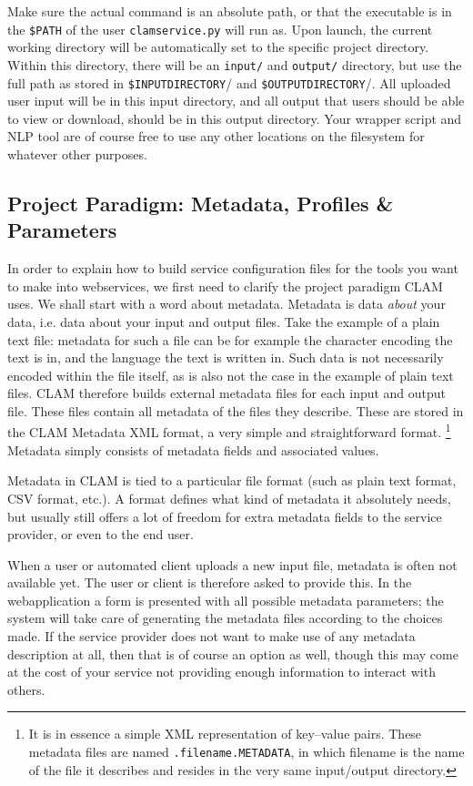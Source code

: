 \documentclass[a4paper,12pt,twoside,openright]{report}
\begin{document}
Make sure the actual command is an absolute path, or that the executable is in
the \texttt{\$PATH} of the user \texttt{clamservice.py} will run as. Upon
launch, the current working directory will be automatically set to the specific
project directory. Within this directory, there will be an \texttt{input/} and
\texttt{output/} directory, but use the full path as stored in
\texttt{\$INPUTDIRECTORY}/ and \texttt{\$OUTPUTDIRECTORY}/. All uploaded user
input will be in this input directory, and all output that users should be able
to view or download, should be in this output directory. Your wrapper script
and NLP tool are of course free to use any other locations on the filesystem
for whatever other purposes.


\subsection{Project Paradigm: Metadata, Profiles \& Parameters}

In order to explain how to build service configuration files for the tools you
want to make into webservices, we first need to clarify the project paradigm CLAM uses.
We shall start with a word about metadata. Metadata is data \emph{about}\/ your
data, i.e. data about your input and output files. Take the example of a plain
text file: metadata for such a file can be for example the character encoding
the text is in, and the language the text is written in. Such data is not
necessarily encoded within the file itself, as is also not the case in the
example of plain text files. CLAM therefore builds external metadata files for
each input and output file. These files contain all metadata of the files they
describe. These are stored in the CLAM Metadata XML format, a very simple and
straightforward format. \footnote{It is in essence a simple XML representation of
key--value pairs. These metadata files are named \texttt{.filename.METADATA},
in which filename is the name of the file it describes and resides in the very
same input/output directory.} Metadata simply consists of metadata fields
and associated values.

Metadata in CLAM is tied to a particular file format (such as plain text
format, CSV format, etc.). A format defines what kind of metadata it absolutely
needs, but usually still offers a lot of freedom for extra metadata fields to
the service provider, or even to the end user. 

When a user or automated client uploads a new input file, metadata is often not
available yet. The user or client is therefore asked to provide this. In the
webapplication a form is presented with all possible metadata parameters; the
system will take care of generating the metadata files according to the choices
made. If the service provider does not want to make use of any metadata
description at all, then that is of course an option as well, though this may
come at the cost of your service not providing enough information to interact
with others.
\end{document}

